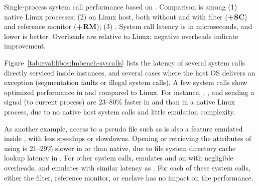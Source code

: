 \label{sec:eval:libos:syscalls}


\begin{table}[t!b!]

\caption{Single-process system call performance based on \lmbench{}. Comparison is among (1) native Linux processes; (2) \graphene{} on Linux host, both without and with \seccomp{} filter ({\bf +SC}) and reference monitor ({\bf +RM}); (3) \graphenesgx{}.
System call latency is in microseconds, and lower is better.
Overheads are relative to Linux; negative overheads indicate improvement.} 
\label{tab:eval:libos:lmbench-syscalls}
\end{table}


Figure~\ref{tab:eval:libos:lmbench-syscalls}
lists the latency of several system calls directly serviced inside \thelibos{} instances,
and several cases where the host OS delivers an exception
(segmentation faults or illegal system calls).
A few system calls show optimized performance
in \graphene{} and \graphenesgx{} compared to Linux.
For instance,
, , and sending a  signal (to current process)
are 23--80\% faster in \graphene{} and \graphenesgx{} than in a native Linux process,
due to no native host system calls and little emulation complexity.



As another example, access to a pseudo file
such as 
is also a feature emulated
inside \thelibos{},
with less speedups or slowdowns.
Opening 
or retrieving the attributes of  using 
is 21--29\% slower in \graphene{} or \graphenesgx{} than native,
due to file system directory cache lookup latency
in \thelibos{}.
For other system calls, \thelibos{} emulates  and 
on 
with negligible overheads,
and emulates  with
similar latency as .
For each of these system calls, either the \seccomp{} filter, reference monitor, or enclave
has no impact on the performance.


